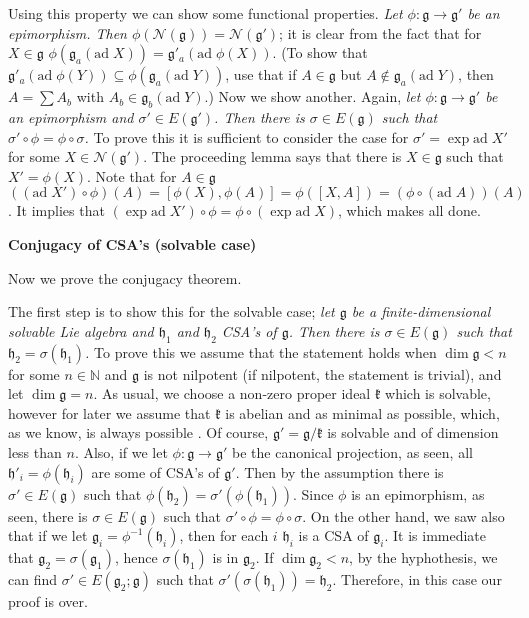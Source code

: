 \documentclass{article}
\newcommand{\NaN}{\mathbb{N}}
\newcommand{\lie}[1]{\mathfrak{#1}}
\newcommand{\ad}[1]{\mathrm{ad}\; #1}
\begin{document}
Using this property we can show some functional properties.
\textit{Let $\phi : \lie{g} \to \lie{g}'$ be an epimorphism. Then $\phi(\mathcal{N}(\lie{g})) = \mathcal{N}(\lie{g}')$}; it is clear from the fact that for $X \in \lie{g}$ $\phi(\lie{g}_a(\ad{X})) = \lie{g}'_a(\ad{\phi(X)})$.
(To show that $\lie{g}'_a(\ad{\phi(Y)}) \subseteq \phi(\lie{g}_a(\ad{Y}))$, use that if $A \in \lie{g}$ but $A \notin \lie{g}_a(\ad{Y})$, then $A = \sum A_b$ with $A_b \in \lie{g}_b(\ad{Y})$.)
Now we show another.
Again, \textit{let $\phi : \lie{g} \to \lie{g}'$ be an epimorphism and $\sigma' \in E(\lie{g}')$.
Then there is $\sigma \in E(\lie{g})$ such that $\sigma' \circ \phi = \phi \circ \sigma$.}
To prove this it is sufficient to consider the case for $\sigma' = \exp{\ad{X'}}$ for some $X \in \mathcal{N}(\lie{g}')$.
The proceeding lemma says that there is $X \in \lie{g}$ such that $X' = \phi(X)$.
Note that for $A \in \lie{g}$ $((\ad{X'}) \circ \phi)(A) = [\phi(X), \phi(A)] = \phi([X, A]) = (\phi \circ (\ad{A}))(A)$.
It implies that $(\exp{\ad{X'}}) \circ \phi = \phi \circ (\exp{\ad{X}})$, which makes all done.

\newpage

\textbf{Conjugacy of CSA's (solvable case)}

Now we prove the conjugacy theorem.

The first step is to show this for the solvable case; \textit{let $\lie{g}$ be a finite-dimensional solvable Lie algebra and $\lie{h}_1$ and $\lie{h}_2$ CSA's of $\lie{g}$.
Then there is $\sigma \in E(\lie{g})$ such that $\lie{h}_2 = \sigma(\lie{h}_1)$.}
To prove this we assume that the statement holds when $\dim{\lie{g}} < n$ for some $n \in \NaN$ and $\lie{g}$ is not nilpotent (if nilpotent, the statement is trivial), and let $\dim{\lie{g}} = n$.
As usual, we choose a non-zero proper ideal $\lie{k}$ which is solvable, however for later we assume that $\lie{k}$ is abelian and as minimal as possible, which, as we know, is always possible .
Of course, $\lie{g}' = \lie{g}/\lie{k}$ is solvable and of dimension less than $n$.
Also, if we let $\phi : \lie{g} \to \lie{g}'$ be the canonical projection, as seen, all $\lie{h}'_i = \phi(\lie{h}_i)$ are some of CSA's of $\lie{g}'$.
Then by the assumption there is $\sigma' \in E(\lie{g})$ such that $\phi(\lie{h}_2) = \sigma'(\phi(\lie{h}_1))$.
Since $\phi$ is an epimorphism, as seen, there is $\sigma \in E(\lie{g})$ such that $\sigma' \circ \phi = \phi \circ \sigma$.
On the other hand, we saw also that if we let $\lie{g}_i = \phi^{-1}(\lie{h}_i)$, then for each $i$ $\lie{h}_i$ is a CSA of $\lie{g}_i$.
It is immediate that $\lie{g}_2 = \sigma(\lie{g}_1)$, hence $\sigma(\lie{h}_1)$ is in $\lie{g}_2$.
If $\dim{\lie{g}_2} < n$, by the hyphothesis, we can find $\sigma' \in E(\lie{g}_2; \lie{g})$ such that $\sigma'(\sigma(\lie{h}_1)) = \lie{h}_2$.
Therefore, in this case our proof is over.
\end{document}
